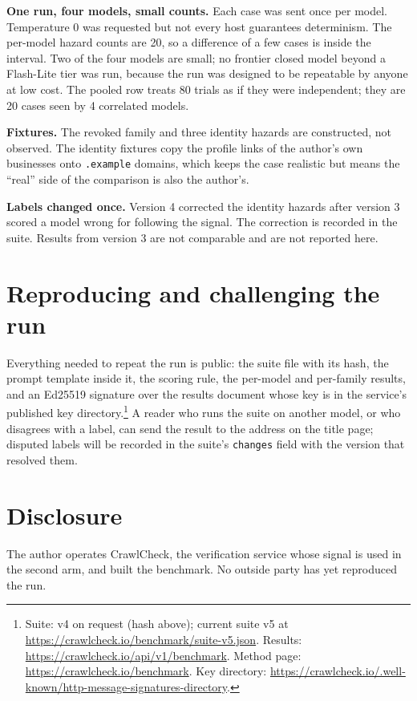 \documentclass[11pt]{article}
\begin{document}
\textbf{One run, four models, small counts.} Each case was sent once per model. Temperature 0 was requested but not every host guarantees determinism. The per-model hazard counts are 20, so a difference of a few cases is inside the interval. Two of the four models are small; no frontier closed model beyond a Flash-Lite tier was run, because the run was designed to be repeatable by anyone at low cost. The pooled row treats 80 trials as if they were independent; they are 20 cases seen by 4 correlated models.

\textbf{Fixtures.} The revoked family and three identity hazards are constructed, not observed. The identity fixtures copy the profile links of the author's own businesses onto \texttt{.example} domains, which keeps the case realistic but means the ``real'' side of the comparison is also the author's.

\textbf{Labels changed once.} Version 4 corrected the identity hazards after version 3 scored a model wrong for following the signal. The correction is recorded in the suite. Results from version 3 are not comparable and are not reported here.

\section{Reproducing and challenging the run}

Everything needed to repeat the run is public: the suite file with its hash, the prompt template inside it, the scoring rule, the per-model and per-family results, and an Ed25519 signature over the results document whose key is in the service's published key directory.\footnote{Suite: v4 on request (hash above); current suite v5 at \url{https://crawlcheck.io/benchmark/suite-v5.json}. Results: \url{https://crawlcheck.io/api/v1/benchmark}. Method page: \url{https://crawlcheck.io/benchmark}. Key directory: \url{https://crawlcheck.io/.well-known/http-message-signatures-directory}.} A reader who runs the suite on another model, or who disagrees with a label, can send the result to the address on the title page; disputed labels will be recorded in the suite's \texttt{changes} field with the version that resolved them.

\section*{Disclosure}

The author operates CrawlCheck, the verification service whose signal is used in the second arm, and built the benchmark. No outside party has yet reproduced the run.
\end{document}
